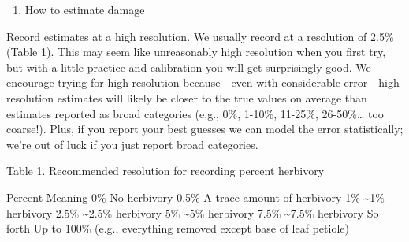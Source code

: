 \documentclass[
  letterpaper,
  DIV=11,
  numbers=noendperiod]{scrreprt}
\providecommand{\tightlist}{%
  \setlength{\itemsep}{0pt}\setlength{\parskip}{0pt}}\usepackage{longtable,booktabs,array}
\begin{document}
\begin{enumerate}
\def\labelenumi{\arabic{enumi}.}
\tightlist
\item
  How to estimate damage
\end{enumerate}

Record estimates at a high resolution. We usually record at a resolution
of 2.5\% (Table 1). This may seem like unreasonably high resolution when
you first try, but with a little practice and calibration you will get
surprisingly good. We encourage trying for high resolution
because---even with considerable error---high resolution estimates will
likely be closer to the true values on average than estimates reported
as broad categories (e.g., 0\%, 1-10\%, 11-25\%, 26-50\%\ldots{} too
coarse!). Plus, if you report your best guesses we can model the error
statistically; we're out of luck if you just report broad categories.

Table 1. Recommended resolution for recording percent herbivory

Percent Meaning 0\% No herbivory 0.5\% A trace amount of herbivory 1\%
\textasciitilde1\% herbivory 2.5\% \textasciitilde2.5\% herbivory 5\%
\textasciitilde5\% herbivory 7.5\% \textasciitilde7.5\% herbivory So
forth Up to 100\% (e.g., everything removed except base of leaf petiole)
\end{document}

